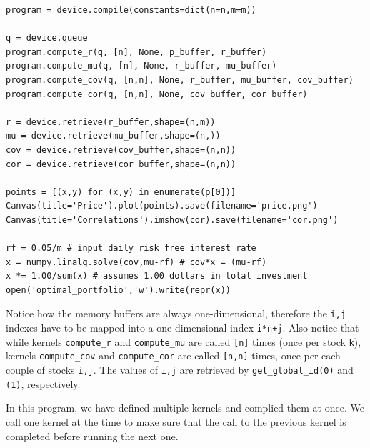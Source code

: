 \documentclass[justified,sixbynine]{tufte-book}
\def\ft{\small\tt}
\theoremstyle{plain}%
\theoremstyle{definition}
\theoremstyle{remark}
\begin{document}
\begin{fullwidth}
\begin{lstlisting}
program = device.compile(constants=dict(n=n,m=m))

q = device.queue
program.compute_r(q, [n], None, p_buffer, r_buffer)
program.compute_mu(q, [n], None, r_buffer, mu_buffer)
program.compute_cov(q, [n,n], None, r_buffer, mu_buffer, cov_buffer)
program.compute_cor(q, [n,n], None, cov_buffer, cor_buffer)

r = device.retrieve(r_buffer,shape=(n,m))
mu = device.retrieve(mu_buffer,shape=(n,))
cov = device.retrieve(cov_buffer,shape=(n,n))
cor = device.retrieve(cor_buffer,shape=(n,n))

points = [(x,y) for (x,y) in enumerate(p[0])]
Canvas(title='Price').plot(points).save(filename='price.png')
Canvas(title='Correlations').imshow(cor).save(filename='cor.png')

rf = 0.05/m # input daily risk free interest rate
x = numpy.linalg.solve(cov,mu-rf) # cov*x = (mu-rf)
x *= 1.00/sum(x) # assumes 1.00 dollars in total investment
open('optimal_portfolio','w').write(repr(x))
\end{lstlisting}

Notice how the memory buffers are always one-dimensional, therefore the {\ft i,j} indexes have to be mapped into a one-dimensional index {\ft i*n+j}. Also notice that while kernels {\ft compute\_r} and {\ft compute\_mu} are called {\ft [n]} times (once per stock {\ft k}), kernels {\ft compute\_cov} and {\ft compute\_cor} are called {\ft [n,n]} times, once per each couple of stocks {\ft i,j}. The values of {\ft i,j} are retrieved by {\ft get\_global\_id(0)} and {\ft (1)}, respectively.

In this program, we have defined multiple kernels and complied them at once. We call one kernel at the time to make sure that the call to the previous kernel is completed before running the next one.


\end{fullwidth}
\end{document}
